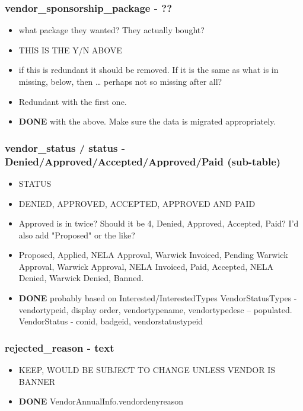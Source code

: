 \documentclass[captions=tablesignature]{scrartcl}
\begin{document}
\subsubsection{vendor\_sponsorship\_package  - ??}
\label{sec-2-2-20}
\begin{itemize}
\item what package they wanted?  They actually bought?
\item THIS IS THE Y/N ABOVE
\item if this is redundant it should be removed.  If it is the same as
what is in missing, below, then \ldots{} perhaps not so missing after
all?
\item Redundant with the first one.
\end{itemize}
\begin{itemize}
\item {\bfseries\sffamily DONE} with the above.  Make sure the data is migrated appropriately.
\label{sec-2-2-20-1}
\end{itemize}

\subsubsection{vendor\_status / status - Denied/Approved/Accepted/Approved/Paid (sub-table)}
\label{sec-2-2-21}
\begin{itemize}
\item STATUS
\item DENIED, APPROVED, ACCEPTED, APPROVED AND PAID
\item Approved is in twice?  Should it be 4, Denied, Approved,
Accepted, Paid?  I'd also add "Proposed" or the like?
\item Proposed, Applied, NELA Approval, Warwick Invoiced, Pending
Warwick Approval, Warwick Approval, NELA Invoiced, Paid,
Accepted, NELA Denied, Warwick Denied, Banned.
\end{itemize}
\begin{itemize}
\item {\bfseries\sffamily DONE} probably based on Interested/InterestedTypes
\label{sec-2-2-21-1}
VendorStatusTypes - vendortypeid, display order, vendortypename,
vendortypedesc -- populated.
VendorStatus - conid, badgeid, vendorstatustypeid
\end{itemize}

\subsubsection{rejected\_reason - text}
\label{sec-2-2-22}
\begin{itemize}
\item KEEP, WOULD BE SUBJECT TO CHANGE UNLESS VENDOR IS BANNER
\end{itemize}
\begin{itemize}
\item {\bfseries\sffamily DONE} VendorAnnualInfo.vendordenyreason
\label{sec-2-2-22-1}
\end{itemize}
\end{document}
